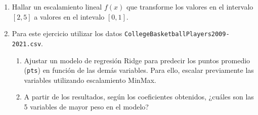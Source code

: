 \documentclass[a4paper,11pt]{article}
\theoremstyle{definition}
\begin{document}
\begin{enumerate}[resume]
\item Hallar un escalamiento lineal $f(x)$ que transforme los valores en el intervalo $[2,5]$ a valores en el intevalo $[0,1]$.


\item Para este ejercicio utilizar los datos \lstinline{CollegeBasketballPlayers2009-2021.csv}.
\begin{enumerate}
\item Ajustar un modelo de regresión Ridge para predecir los puntos promedio (\lstinline{pts}) en función de las demás variables.
Para ello, escalar previamente las variables utilizando escalamiento MinMax.
\item A partir de los resultados, según los coeficientes obtenidos, ¿cuáles son las 5 variables de mayor peso en el modelo?
\end{enumerate}


\end{enumerate}
\end{document}
